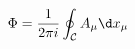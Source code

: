 \begin{equation}
\label{flux-def}
\Phi = \frac{1}{2 \pi i} \oint_{\mathcal C} A_\mu \d x_\mu 
\end{equation}

